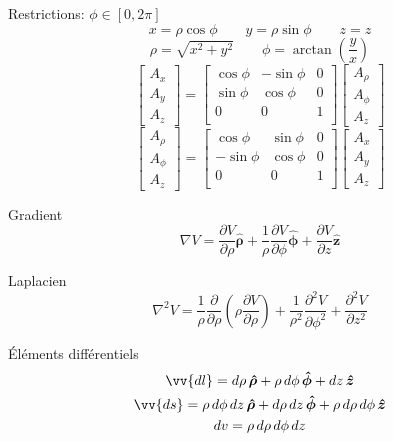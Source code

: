 \documentclass[10pt,landscape]{article}
\newcommand{\extraline}{\vspace{1em}}
\newcommand{\uvec}[1]{\ensuremath{\boldsymbol{\hat{#1}}}}
\begin{document}
\begin{multicols}{3}
Restrictions: $\phi\in[0,2\pi]$
\[ x = \rho\cos\phi \qquad y = \rho\sin\phi \qquad z=z  \]
\[ \rho = \sqrt{x^2 + y^2} \qquad \phi = \arctan\left(\frac{y}{x}\right) \]
%
\[
\begin{bmatrix}
	A_x \\ A_y \\ A_z
\end{bmatrix}
=
\begin{bmatrix}
	\cos\phi & -\sin\phi & 0 \\
	\sin\phi & \cos\phi & 0 \\
	0 & 0 & 1 \\
\end{bmatrix}
\begin{bmatrix}
	A_\rho \\ A_\phi \\ A_z
\end{bmatrix}
\]
\[
\begin{bmatrix}
	A_\rho \\ A_\phi \\ A_z
\end{bmatrix}
=
\begin{bmatrix}
	\cos\phi & \sin\phi & 0 \\
	-\sin\phi & \cos\phi & 0 \\
	0 & 0 & 1 \\
\end{bmatrix}
\begin{bmatrix}
	A_x \\ A_y \\ A_z
\end{bmatrix}
\]

\extraline
Gradient
\[ \nabla V = \frac{\partial V}{\partial \rho}\uvec{\rho} + \frac{1}{\rho}\frac{\partial V}{\partial \phi}\uvec{\phi} + \frac{\partial V}{\partial z}\uvec{z} \]

Laplacien
\[ \nabla^2 V = 
\frac{1}{\rho} \frac{\partial}{\partial \rho} \left( \rho\frac{\partial V}{\partial \rho} \right)
+ \frac{1}{\rho^2}\frac{\partial^2 V}{\partial \phi^2}
+ \frac{\partial^2 V}{\partial z^2} \]

Éléments différentiels
\begin{gather*}
\vv{dl} = d\rho\,\uvec{\rho} + \rho\,d\phi\,\uvec{\phi} + dz\,\uvec{z} \\
\vv{ds} = \rho\,d\phi\,dz\,\uvec{\rho} + d\rho\,dz\,\uvec{\phi} + \rho\,d\rho\,d\phi\,\uvec{z} \\
dv = \rho\,d\rho\,d\phi\,dz
\end{gather*}


\end{multicols}
\end{document}
